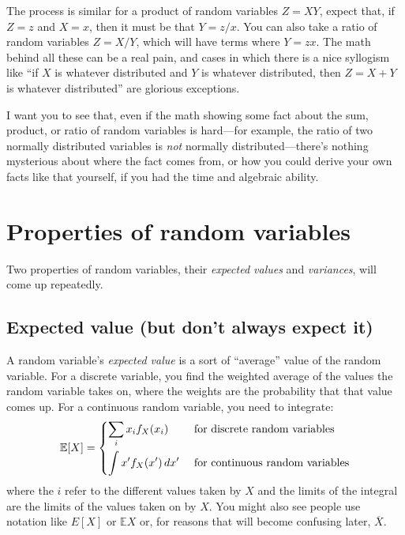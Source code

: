 The process is similar for a product of random variables $Z = XY$, expect
that, if $Z = z$ and $X = x$, then it must be that $Y = z/x$. You can also
take a ratio of random variables $Z = X/Y$, which will have terms where $Y =
zx$. The math behind all these can be a real pain, and cases in which there is
a nice syllogism like ``if $X$ is whatever distributed and $Y$ is whatever
distributed, then $Z = X + Y$ is whatever distributed'' are glorious
exceptions.

I want you to see that, even if the math showing some fact about the sum,
product, or ratio of random variables is hard---for example, the ratio of two
normally distributed variables is \emph{not} normally distributed---there's
nothing mysterious about where the fact comes from, or how you could derive
your own facts like that yourself, if you had the time and algebraic ability.

\section{Properties of random variables}

Two properties of random variables, their \emph{expected values} and
\emph{variances}, will come up repeatedly.

\subsection{Expected value (but don't always expect it)}

A random variable's \emph{expected value} is a sort of ``average'' value of
the random variable. For a discrete variable, you find the weighted average of
the values the random variable takes on, where the weights are the probability
that that value comes up. For a continuous random variable, you need to
integrate:
\begin{equation}
\mathbb{E}\!\left[{X}\right] = \begin{dcases}
  \sum_i x_i f_X(x_i) & \text{ for discrete random variables} \\
  \int x' f_X(x') \,dx' & \text{ for continuous random variables}
\end{dcases}
\end{equation}
where the $i$ refer to the different values taken by $X$ and the limits of the
integral are the limits of the values taken on by $X$. You might also see
people use notation like $E[X]$ or $\mathbb{E}X$ or, for reasons that will
become confusing later, $\overline{X}$.

